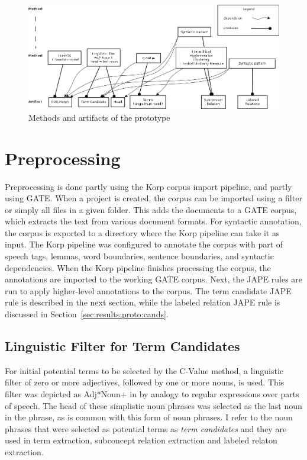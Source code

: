 \documentclass[a4paper]{report}
\begin{document}
\begin{figure}
  \includegraphics[width=\textwidth]{graphics/method-element-dependencies.png}
  \caption{Methods and artifacts of the prototype}
  \label{fig:method-artifact}
\end{figure}

\section{Preprocessing}
\label{sec:results:proto:prepr}
Preprocessing is done partly using the Korp corpus import pipeline, and partly using GATE.
When a project is created, the corpus can be imported using a filter or simply all files in a given folder.
This adds the documents to a GATE corpus, which extracts the text from various document formats.
For syntactic annotation, the corpus is exported to a directory where the Korp pipeline can take it as input.
The Korp pipeline was configured to annotate the corpus with part of speech tags, lemmas, word boundaries, sentence boundaries, and syntactic dependencies.
When the Korp pipeline finishes processing the corpus, the annotations are imported to the working GATE corpus.
Next, the JAPE rules are run to apply higher-level annotations to the corpus.
The term candidate JAPE rule is described in the next section, while the labeled relation JAPE rule is discussed in Section~\ref{sec:results:proto:cands}.

\subsection{Linguistic Filter for Term Candidates}

For initial potential terms to be selected by the C-Value method, a linguistic filter of zero or more adjectives, followed by one or more nouns, is used.
This filter was depicted as Adj*Noun+ in \cite{Frantzi98CNCValue} by analogy to regular expressions over parts of speech.
The head of these simplistic noun phrases was selected as the last noun in the phrase, as is common with this form of noun phrases.
I refer to the noun phrases that were selected as potential terms as \emph{term candidates} and they are used in term extraction, subconcept relation extraction and labeled relaton extraction.
\end{document}
